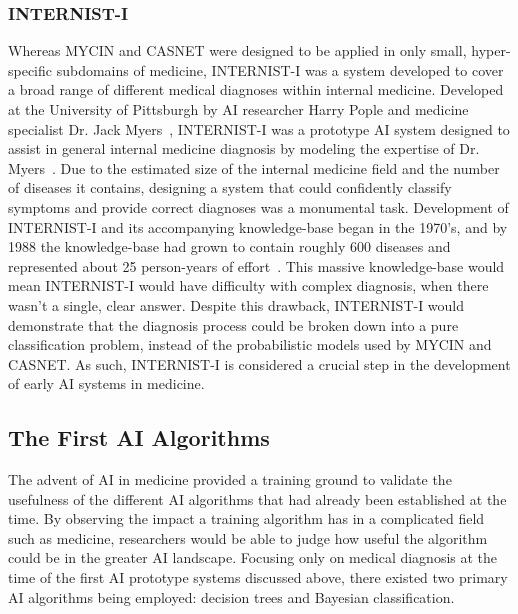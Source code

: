 \documentclass{article}
\begin{document}
\subsubsection{INTERNIST-I}

Whereas MYCIN and CASNET were designed to be applied in only small, hyper-specific subdomains of medicine, INTERNIST-I was a system developed to cover a broad range of different medical diagnoses within internal medicine. Developed at the University of Pittsburgh by AI researcher Harry Pople and medicine specialist Dr. Jack Myers~\cite{kulikowski_beginnings_2019}, INTERNIST-I was a prototype AI system designed to assist in general internal medicine diagnosis by modeling the expertise of Dr. Myers~\cite{wolfram_appraisal_1995}. Due to the estimated size of the internal medicine field and the number of diseases it contains, designing a system that could confidently classify symptoms and provide correct diagnoses was a monumental task. Development of INTERNIST-I and its accompanying knowledge-base began in the 1970's, and by 1988 the knowledge-base had grown to contain roughly 600 diseases and represented about 25 person-years of effort~\cite{wolfram_appraisal_1995}. This massive knowledge-base would mean INTERNIST-I would have difficulty with complex diagnosis, when there wasn't a single, clear answer. Despite this drawback, INTERNIST-I would demonstrate that the diagnosis process could be broken down into a pure classification problem, instead of the probabilistic models used by MYCIN and CASNET. As such, INTERNIST-I is considered a crucial step in the development of early AI systems in medicine.

\subsection{The First AI Algorithms}

The advent of AI in medicine provided a training ground to validate the usefulness of the different AI algorithms that had already been established at the time. By observing the impact a training algorithm has in a complicated field such as medicine, researchers would be able to judge how useful the algorithm could be in the greater AI landscape. Focusing only on medical diagnosis at the time of the first AI prototype systems discussed above, there existed two primary AI algorithms being employed: decision trees and Bayesian classification.  
\end{document}
